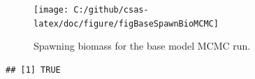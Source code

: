 \documentclass[11pt]{book}\usepackage[]{graphicx}\usepackage[]{color}
\makeatletter
\newenvironment{kframe}{%
 \def\at@end@of@kframe{}%
 \ifinner\ifhmode%
  \def\at@end@of@kframe{\end{minipage}}%
  \begin{minipage}{\columnwidth}%
 \fi\fi%
 \def\FrameCommand##1{\hskip\@totalleftmargin \hskip-\fboxsep
 \colorbox{shadecolor}{##1}\hskip-\fboxsep
     \hskip-\linewidth \hskip-\@totalleftmargin \hskip\columnwidth}%
 \MakeFramed {\advance\hsize-\width
   \@totalleftmargin\z@ \linewidth\hsize
   \@setminipage}}%
 {\par\unskip\endMakeFramed%
 \at@end@of@kframe}
\newenvironment{knitrout}{}{} %
\makeatother
\begin{document}
\begin{knitrout}
\color{fgcolor}\begin{figure}[]

\texttt{[image: C:/github/csas-latex/doc/figure/figBaseSpawnBioMCMC]} \caption[Spawning biomass for the base model MCMC run]{Spawning biomass for the base model MCMC run.\label{fig:figBaseSpawnBioMCMC}}
\end{figure}

\begin{kframe}\begin{verbatim}
## [1] TRUE
\end{verbatim}
\end{kframe}
\end{knitrout}





\newpage



%

%

%


%

%

%

%
\end{document}
